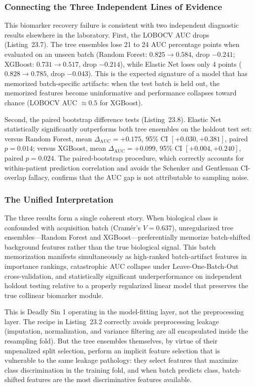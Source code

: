 \documentclass[11pt,oneside]{book}
\begin{document}
\subsubsection{Connecting the Three Independent Lines of Evidence}
This biomarker recovery failure is consistent with two independent diagnostic results elsewhere in the laboratory.
First, the LOBOCV AUC drops (Listing~23.7). The tree ensembles lose 21 to 24 AUC percentage points when evaluated on an unseen batch (Random Forest: $0.825 \to 0.584$, drop $-0.241$; XGBoost: $0.731 \to 0.517$, drop $-0.214$), while Elastic Net loses only 4 points ($0.828 \to 0.785$, drop $-0.043$). This is the expected signature of a model that has memorized batch-specific artifacts: when the test batch is held out, the memorized features become uninformative and performance collapses toward chance (LOBOCV AUC $\approx 0.5$ for XGBoost).

Second, the paired bootstrap difference tests (Listing~23.8). Elastic Net statistically significantly outperforms both tree ensembles on the holdout test set: versus Random Forest, mean $\Delta_{\text{AUC}} = +0.175$, 95\% CI $[+0.030, +0.381]$, paired $p = 0.014$; versus XGBoost, mean $\Delta_{\text{AUC}} = +0.099$, 95\% CI $[+0.004, +0.240]$, paired $p = 0.024$. The paired-bootstrap procedure, which correctly accounts for within-patient prediction correlation and avoids the Schenker and Gentleman \cite{schenker2001judging} CI-overlap fallacy, confirms that the AUC gap is not attributable to sampling noise.

\subsubsection{The Unified Interpretation}
The three results form a single coherent story. When biological class is confounded with acquisition batch (Cram\'er's $V = 0.637$), unregularized tree ensembles---Random Forest and XGBoost---preferentially memorize batch-shifted background features rather than the true biological signal. This batch memorization manifests simultaneously as high-ranked batch-artifact features in importance rankings, catastrophic AUC collapse under Leave-One-Batch-Out cross-validation, and statistically significant underperformance on independent holdout testing relative to a properly regularized linear model that preserves the true collinear biomarker module.

This is Deadly Sin 1 operating in the model-fitting layer, not the preprocessing layer. The recipe in Listing~23.2 correctly avoids preprocessing leakage (imputation, normalization, and variance filtering are all encapsulated inside the resampling fold). But the tree ensembles themselves, by virtue of their unpenalized split selection, perform an implicit feature selection that is vulnerable to the same leakage pathology: they select features that maximize class discrimination in the training fold, and when batch predicts class, batch-shifted features are the most discriminative features available.
\end{document}
